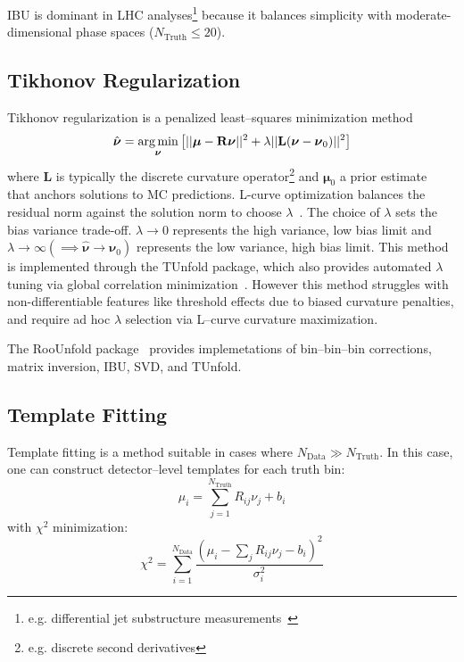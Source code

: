 IBU is dominant in LHC analyses\footnote{e.g. differential jet substructure measurements~\cite{atlas_collaboration_measurement_2024}} because it balances simplicity with moderate-dimensional phase spaces (\(N_{\text{Truth}} \leq 20\)).

\subsection{Tikhonov Regularization}  
Tikhonov regularization is a penalized least--squares minimization method
\begin{equation}
    \hat{\boldsymbol{\nu}} =\underset{\boldsymbol{\nu}}{\arg\min} \left[ ||\vb*{\mu} - \mathbf{R}\boldsymbol{\nu}||^2 + \lambda ||\mathbf{L}(\boldsymbol{\nu} - \boldsymbol{\nu}_0)||^2 \right]
\end{equation}  
where \(\mathbf{L}\) is typically the discrete curvature operator\footnote{e.g. discrete second derivatives} and \(\boldsymbol{\mu}_0\) a prior estimate~\cite{cowan_topics_2009} that anchors solutions to MC predictions.
%
L-curve optimization balances the residual norm against the solution norm to choose \(\lambda\)~\cite{cowan_highlights_2011}.
%
The choice of \(\lambda\) sets the bias variance trade-off.
%
\(\lambda \rightarrow 0\) represents the high variance, low bias limit and \(\lambda \rightarrow \infty (\implies \hat{\boldsymbol{\nu}} \rightarrow \boldsymbol{\nu}_0)\) represents the low variance, high bias limit.
%
This method is implemented through the TUnfold package, which also provides automated \(\lambda\) tuning via global correlation minimization~\cite{schmitt_tunfold_2012}.
%
However this method struggles with non-differentiable features like threshold effects due to biased curvature penalties, and require ad hoc \(\lambda\) selection via L--curve curvature maximization.

\begin{note}{The RooUnfold package~\cite{adye_unfolding_2011} provides implemetations of bin--bin--bin corrections, matrix inversion, IBU, SVD, and TUnfold.}
\end{note}
\subsection{Template Fitting}  
Template fitting is a method suitable in cases where \(N_{\text{Data}} \gg N_{\text{Truth}}\).
%
In this case, one can construct detector--level templates for each truth bin:  
\begin{equation}
    \mu_i = \sum_{j=1}^{N_{\text{Truth}}} R_{ij} \nu_j + b_i
\end{equation}  
with \(\chi^2\) minimization:  
\begin{equation}
    \chi^2 = \sum_{i=1}^{N_{\text{Data}}} \frac{(\mu_i - \sum_j R_{ij}\nu_j - b_i)^2}{\sigma_i^2}
\end{equation}  

